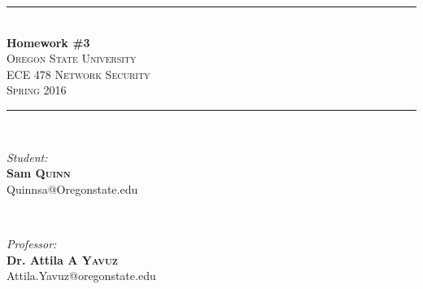 \documentclass[letterpaper,11pt,notitlepage,fleqn]{article}
\begin{document}
\begin{titlepage}
    \vspace*{\fill}

    \newcommand{\HRule}{\rule{\linewidth}{0.5mm}} %

    \center %


    \HRule \\[0.4cm]
    { \huge \bfseries Homework \#3}\\[0.4cm] %


    \textsc{\LARGE Oregon State University}\\[0.5cm] %
    \textsc{\Large ECE 478 Network Security}\\[0.5cm] %
    \textsc{\large Spring 2016}\\[0.5cm] %


    \HRule \\[1.5cm]

    \begin{minipage}{0.4\textwidth}
        \begin{flushleft} \large
            \emph{Student:}\\
            \noindent \textbf{Sam \textsc{Quinn}} \\ %
            {\small Quinnsa@Oregonstate.edu}
        \end{flushleft}
    \end{minipage}
        ~
        \begin{minipage}{0.4\textwidth}
            \begin{flushright} \large
                \emph{Professor:} \\
                \noindent \textbf{Dr. Attila A \textsc{Yavuz}} \\ %
                {\small Attila.Yavuz@oregonstate.edu}
            \end{flushright}
        \end{minipage}\\[3cm]


\end{titlepage}
\end{document}
